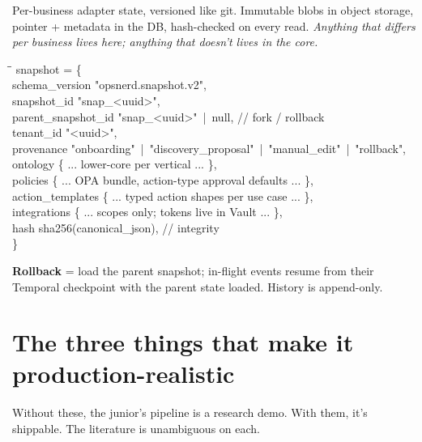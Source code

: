 \documentclass[11pt,a4paper]{article}
\begin{document}
Per-business adapter state, versioned like git. Immutable blobs in object
storage, pointer + metadata in the DB, hash-checked on every read.
\emph{Anything that differs per business lives here; anything that
doesn't lives in the core.}

\begin{codebox}
\begin{tabbing}
\hspace{0.5cm}\=\hspace{4.5cm}\=\kill
snapshot = \{\\
  \>schema\_version\:      "opsnerd.snapshot.v2",\\
  \>snapshot\_id\:         "snap\_<uuid>",\\
  \>parent\_snapshot\_id\:  "snap\_<uuid>" \,|\, null,           // fork / rollback\\
  \>tenant\_id\:           "<uuid>",\\
  \>provenance\:           "onboarding" \,|\, "discovery\_proposal" \,|\, "manual\_edit" \,|\, "rollback",\\
  \>ontology\:             \{ ... lower-core per vertical ... \},\\
  \>policies\:             \{ ... OPA bundle, action-type approval defaults ... \},\\
  \>action\_templates\:     \{ ... typed action shapes per use case ... \},\\
  \>integrations\:         \{ ... scopes only; tokens live in Vault ... \},\\
  \>hash\:                 sha256(canonical\_json),                 // integrity\\
\}
\end{tabbing}
\end{codebox}

\textbf{Rollback} = load the parent snapshot; in-flight events resume from
their Temporal checkpoint with the parent state loaded. History is
append-only.

\section{The three things that make it production-realistic}

Without these, the junior's pipeline is a research demo. With them, it's
shippable. The literature is unambiguous on each.
\end{document}
